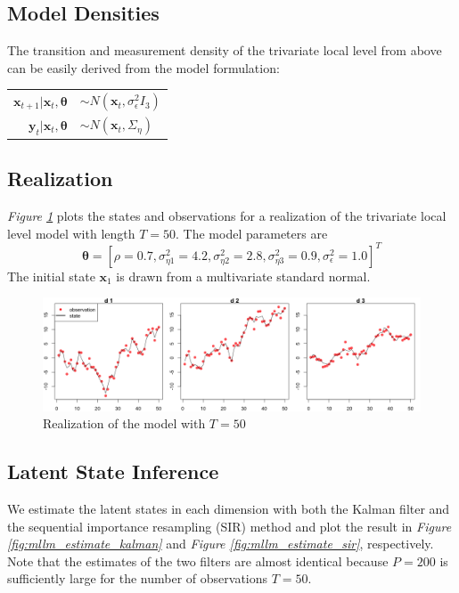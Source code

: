 \documentclass[11pt, oneside]{scrreprt}   	%
\begin{document}
\subsection{Model Densities}
The transition and measurement density of the trivariate local level from above can be easily derived from the model formulation:
\begin{center}
\begin{tabular}{ r l }
  $\boldsymbol{x}_{t+1} | \boldsymbol{x}_t, \boldsymbol{\theta}$ & $\sim N(\boldsymbol{x}_t, \sigma_{\epsilon}^2 I_3)$ \\
  $\boldsymbol{y}_t | \boldsymbol{x}_t, \boldsymbol{\theta}$ & $\sim N(\boldsymbol{x}_t, \Sigma_{\eta})$ \\
\end{tabular}
\end{center}

\subsection{Realization}
\textit{Figure \ref{fig:mllm_realization}} plots the states and observations for a realization of the trivariate local level model with length $T=50$. The model parameters are 
$$
\boldsymbol{\theta} = [\rho = 0.7, \sigma_{\eta 1}^2 = 4.2, \sigma_{\eta 2}^2 = 2.8, \sigma_{\eta 3}^2 = 0.9, \sigma_{\epsilon}^2 = 1.0]^T
$$
The initial state $\boldsymbol{x}_1$ is drawn from a multivariate standard normal.

\begin{figure}[h!]
\centering
\includegraphics[width=155mm]{../../images/mllm-realization-v2.png}
\caption{Realization of the model with $T=50$}
\label{fig:mllm_realization}
\end{figure}

\subsection{Latent State Inference}
We estimate the latent states in each dimension with both the Kalman filter and the sequential importance resampling (SIR) method and plot the result in \textit{Figure \ref{fig:mllm_estimate_kalman}} and \textit{Figure \ref{fig:mllm_estimate_sir}}, respectively. Note that the estimates of the two filters are almost identical because $P=200$ is sufficiently large for the number of observations $T=50$.\\
\end{document}
